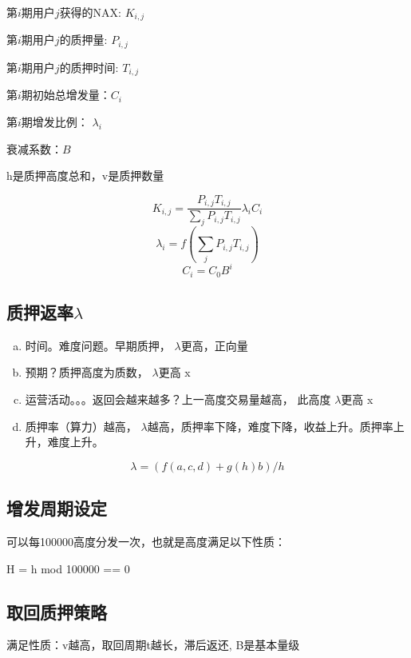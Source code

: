         第\(i\)期用户\(j\)获得的NAX: \(K_{i,j}\)

        第\(i\)期用户\(j\)的质押量: \(P_{i,j}\)

        第\(i\)期用户\(j\)的质押时间: \(T_{i,j}\)

        第\(i\)期初始总增发量：\(C_i\)

        第\(i\)期增发比例： \(\lambda_i\)

        衰减系数：\(B\)

        h是质押高度总和，v是质押数量

\begin{equation}
  K_{i,j} = \frac{P_{i,j} T_{i,j}}{\sum_j P_{i,j} T_{i,j}} \lambda_i C_i
\end{equation}
\begin{equation}
  \lambda_i = f(\sum_j P_{i,j} T_{i,j})
\end{equation}
\begin{equation}
  C_i = C_0 B^i
\end{equation}

\subsection{质押返率\(\lambda\)}
\begin{enumerate}[a.]
  \item 时间。难度问题。早期质押， \(\lambda\)更高，正向量
  \item 预期？质押高度为质数， \(\lambda\)更高 x
  \item 运营活动。。。返回会越来越多？上一高度交易量越高， 此高度 \(\lambda\)更高 x
  \item 质押率（算力）越高， \(\lambda\)越高，质押率下降，难度下降，收益上升。质押率上升，难度上升。
\end{enumerate}

\begin{equation}
\lambda = (f(a, c, d) + g(h) b) / h
\end{equation}

\subsection{增发周期设定}
可以每100000高度分发一次，也就是高度满足以下性质：

H = h mod 100000 == 0

\subsection{取回质押策略}
满足性质：v越高，取回周期t越长，滞后返还, B是基本量级

